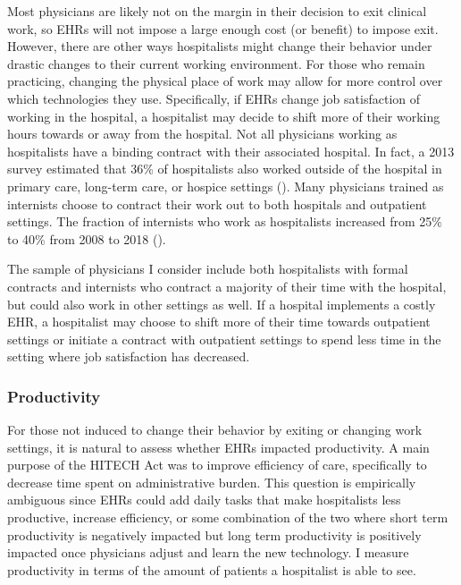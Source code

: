 \documentclass[12pt]{article}
\begin{document}
Most physicians are likely not on the margin in their decision to exit clinical work, so EHRs will not impose a large enough cost (or benefit) to impose exit. However, there are other ways hospitalists might change their behavior under drastic changes to their current working environment. For those who remain practicing, changing the physical place of work may allow for more control over which technologies they use. Specifically, if EHRs change job satisfaction of working in the hospital, a hospitalist may decide to shift more of their working hours towards or away from the hospital. Not all physicians working as hospitalists have a binding contract with their associated hospital. In fact, a 2013 survey estimated that 36\% of hospitalists also worked outside of the hospital in primary care, long-term care, or hospice settings (\cite{Today}). Many physicians trained as internists choose to contract their work out to both hospitals and outpatient settings. The fraction of internists who work as hospitalists increased from 25\% to 40\% from 2008 to 2018 (\cite{gray2022evolving}).  

The sample of physicians I consider include both hospitalists with formal contracts and internists who contract a majority of their time with the hospital, but could also work in other settings as well. If a hospital implements a costly EHR, a hospitalist may choose to shift more of their time towards outpatient settings or initiate a contract with outpatient settings to spend less time in the setting where job satisfaction has decreased.


\subsubsection{Productivity}

For those not induced to change their behavior by exiting or changing work settings, it is natural to assess whether EHRs impacted productivity. A main purpose of the HITECH Act was to improve efficiency of care, specifically to decrease time spent on administrative burden. This question is empirically ambiguous since EHRs could add daily tasks that make hospitalists less productive, increase efficiency, or some combination of the two where short term productivity is negatively impacted but long term productivity is positively impacted once physicians adjust and learn the new technology. I measure productivity in terms of the amount of patients a hospitalist is able to see. 
\end{document}
